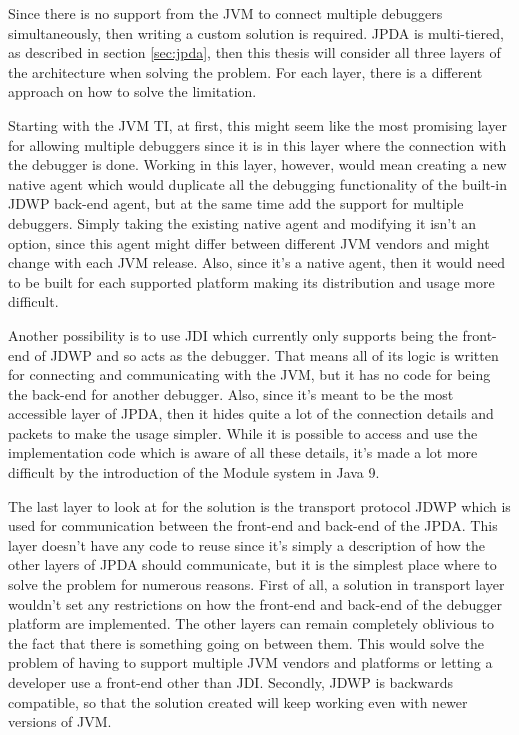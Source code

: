 \documentclass[..thesis.tex]{subfiles}
\begin{document}
Since there is no support from the JVM to connect multiple debuggers simultaneously, then writing a custom solution is required. 
JPDA is multi-tiered, as described in section \ref{sec:jpda}, then this thesis will consider all three layers of the architecture when solving the problem.
For each layer, there is a different approach on how to solve the limitation.

Starting with the JVM TI, at first, this might seem like the most promising layer for allowing multiple debuggers since it is in this layer where the connection with the debugger is done.
Working in this layer, however, would mean creating a new native agent which would duplicate all the debugging functionality of the built-in JDWP back-end agent, but at the same time add the support for multiple debuggers.
Simply taking the existing native agent and modifying it isn't an option, since this agent might differ between different JVM vendors and might change with each JVM release.
Also, since it's a native agent, then it would need to be built for each supported platform making its distribution and usage more difficult.

Another possibility is to use JDI which currently only supports being the front-end of JDWP and so acts as the debugger.
That means all of its logic is written for connecting and communicating with the JVM, but it has no code for being the back-end for another debugger.
Also, since it's meant to be the most accessible layer of JPDA, then it hides quite a lot of the connection details and packets to make the usage simpler.
While it is possible to access and use the implementation code which is aware of all these details, it's made a lot more difficult by the introduction of the Module system in Java 9.

The last layer to look at for the solution is the transport protocol JDWP which is used for communication between the front-end and back-end of the JPDA.
This layer doesn't have any code to reuse since it's simply a description of how the other layers of JPDA should communicate, but it is the simplest place where to solve the problem for numerous reasons.
First of all, a solution in transport layer wouldn't set any restrictions on how the front-end and back-end of the debugger platform are implemented.
The other layers can remain completely oblivious to the fact that there is something going on between them.
This would solve the problem of having to support multiple JVM vendors and platforms or letting a developer use a front-end other than JDI.
Secondly, JDWP is backwards compatible, so that the solution created will keep working even with newer versions of JVM.
\end{document}
